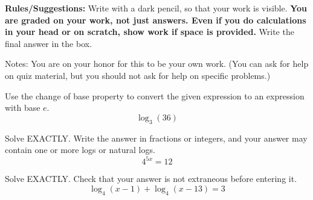 \documentclass[11pt,addpoints,answers]{exam}
\begin{document}


{\small \noindent \textbf{Rules/Suggestions:} Write with a dark pencil, so that your work is visible.  \textbf{You are graded on your work, not just answers. Even if you do calculations in your head or on scratch, show work if space is provided. } Write the final answer in the box.

Notes: You are on your honor for this to be your own work.  (You can ask for help on quiz material, but you should not ask for help on specific problems.) }
\begin{questions}


\setlength\columnsep{2cm}

\begin{multicols}{2}
\question[10] Use the change of base property to convert the given expression to an expression with base $e$.
\[\log_3 (36)\]
\vspace*{1.5in}
\begin{flushright}\end{flushright}
\columnbreak

\question[10] Solve EXACTLY.  Write the answer in fractions or integers, and your answer may contain one or more logs or natural logs.
\[4^{5x} = 12\]
\vspace*{1.5in}
\begin{flushright}\end{flushright}
\end{multicols}

\begin{multicols}{2}
\question[10] Solve EXACTLY.  Check that your answer is not extraneous before entering it.
\[\log_4 (x-1) + \log_4 (x-13) = 3\]
\vspace*{2in}
\begin{flushright}\end{flushright}
\columnbreak


\end{multicols}
\end{questions}
\end{document}
